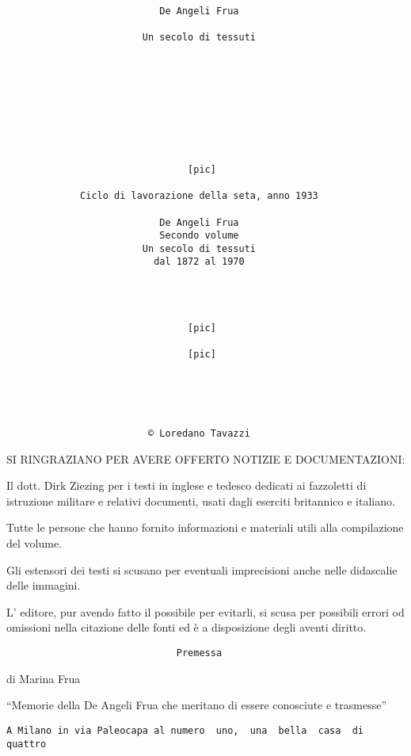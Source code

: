 \begin{verbatim}
                           De Angeli Frua

                        Un secolo di tessuti









                                [pic]

             Ciclo di lavorazione della seta, anno 1933

                           De Angeli Frua
                           Secondo volume
                        Un secolo di tessuti
                          dal 1872 al 1970




                                [pic]

                                [pic]





                         © Loredano Tavazzi
\end{verbatim}

SI RINGRAZIANO PER AVERE OFFERTO NOTIZIE E DOCUMENTAZIONI:

Il dott. Dirk Ziezing per i testi in inglese e tedesco dedicati ai
fazzoletti di istruzione militare e relativi documenti, usati dagli
eserciti britannico e italiano.

Tutte le persone che hanno fornito informazioni e materiali utili alla
compilazione del volume.

Gli estensori dei testi si scusano per eventuali imprecisioni anche
nelle didascalie delle immagini.

L' editore, pur avendo fatto il possibile per evitarli, si scusa per
possibili errori od omissioni nella citazione delle fonti ed è a
disposizione degli aventi diritto.

\begin{verbatim}
                              Premessa
\end{verbatim}

di Marina Frua

``Memorie della De Angeli Frua che meritano di essere conosciute e
trasmesse''

\begin{verbatim}
A Milano in via Paleocapa al numero  uno,  una  bella  casa  di  quattro
\end{verbatim}

